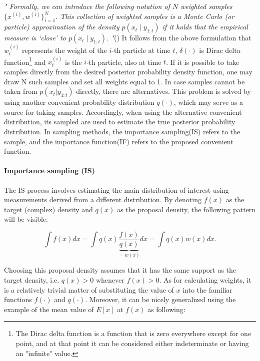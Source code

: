 {\em
"
Formally, we can introduce the following notation of \(N\) weighted samples \(\{x^{(i)},w^{(i)}\}^N_{i=1}\). This collection of weighted samples is a Monte Carlo (or particle) approximation of the density \(p\left(x_t \mid y_{1: t}\right)\) if it holds that the empirical measure is ‘close’ to \(p\left(x_t \mid y_{1: t}\right)\).
"}(\cite[page~40]{Svensson2016LearningPM})
It follows from the above formulation that \(w_t^{(i)}\) represents the weight of the \(i\)-th particle at time \(t\), \(\delta(\cdot)\) is Dirac delta function\footnote{The Dirac delta function is a function that is zero everywhere except for one point, and at that point it can be considered either indeterminate or having an "infinite" value.} and \(x_t^{(i)}\) is the \(i\)-th particle, also at time \(t\). If it is possible to take samples directly from the desired posterior probability density function, one may draw N such samples and set all weights equal to 1. In case samples cannot be taken from \(p(x_t|y_{1:t})\) directly, there are alternatives. This problem is solved by using another convenient probability distribution \(q(\cdot)\), which may serve as a source for taking samples. Accordingly, when using the alternative convenient distribution, its sampled are used to estimate the true posterior probability distribution. In sampling methods, the importance sampling(IS) refers to the sample, and the importance function(IF) refers to the proposed convenient function.

\paragraph*{Importance sampling (IS)}
The IS process involves estimating the main distribution of interest using measurements derived from a different distribution. By denoting \(f(x)\) as the target (complex) density and \(q(x)\) as the proposal density, the following pattern will be visible:

\begin{equation}
    \int f(x) dx = \int q(x) \underbrace{\frac{f(x)}{q(x)}}_{= w(x)} dx = \int q(x) w(x) dx.
\end{equation}

Choosing this proposal density assumes that it has the same support as the target density, i.e. \(q(x) > 0\) whenever \(f(x) > 0\). As for calculating weights, it is a relatively trivial matter of substituting the value of $x$ into the familiar functions \(f(\cdot)\) and \(q(\cdot)\). Moreover, it can be nicely generalized using the example of the mean value of \(E[x]\) at \(f(x)\) as following:

